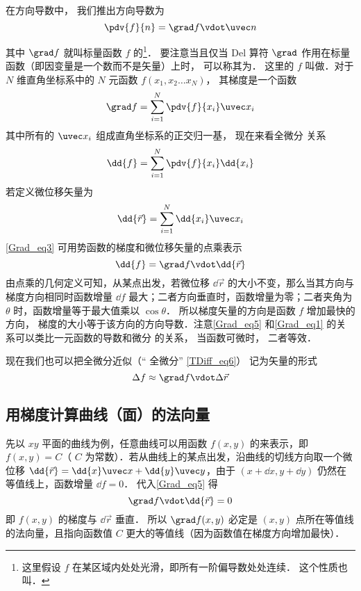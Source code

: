 

在方向导数中， 我们推出方向导数为
\begin{equation}\label{Grad_eq1}
\pdv{f}{n} = \grad f \vdot \uvec n
\end{equation}
 
其中 $\grad f$ 就叫标量函数 $f$ 的\footnote{这里假设 $f$ 在某区域内处处光滑，即所有一阶偏导数处处连续． 这个性质也叫．}． 要注意当且仅当 Del 算符 $\grad$ 作用在标量函数（即因变量是一个数而不是矢量）上时， 可以称其为． 这里的 $f$ 叫做．对于 $N$ 维直角坐标系中的 $N$ 元函数 $f(x_1,x_2\dots x_N)$， 其梯度是一个函数
\begin{equation}
\grad f = \sum_{i=1}^{N}\pdv{f}{x_i}\uvec x_i
\end{equation}
其中所有的 $\uvec x_i$ 组成直角坐标系的正交归一基， 现在来看全微分 关系
\begin{equation}\label{Grad_eq3}
\dd{f} = \sum_{i = 1}^N \pdv{f}{x_i} \dd{x_i}
\end{equation}
若定义微位移矢量为
\begin{equation}
\dd{\vec r} = \sum_{i=1}^{N} \dd{x_i} \uvec x_i
\end{equation}
\autoref{Grad_eq3} 可用势函数的梯度和微位移矢量的点乘表示
\begin{equation}\label{Grad_eq5}
\dd{f} = \grad f \vdot \dd{\vec r}
\end{equation}
由点乘的几何定义可知，从某点出发，若微位移 $\dd{\vec r}$ 的大小不变，那么当其方向与梯度方向相同时函数增量 $\dd{f}$ 最大；二者方向垂直时，函数增量为零；二者夹角为 $\theta$ 时，函数增量等于最大值乘以 $\cos \theta$． 所以梯度矢量的方向是函数 $f$ 增加最快的方向， 梯度的大小等于该方向的方向导数．注意\autoref{Grad_eq5} 和\autoref{Grad_eq1} 的关系可以类比一元函数的导数和微分 的关系， 当函数可微时， 二者等效．

现在我们也可以把全微分近似（“ 全微分” \autoref{TDiff_eq6}） 记为矢量的形式
\begin{equation}\label{Grad_eq6}
\Delta f \approx \grad f \vdot \Delta \vec r
\end{equation}

\subsection{用梯度计算曲线（面）的法向量}
先以 $xy$ 平面的曲线为例，任意曲线可以用函数 $f(x,y)$ 的来表示，即 $f(x,y) = C$（ $C$ 为常数）．若从曲线上的某点出发，沿曲线的切线方向取一个微位移 $\dd{\vec r} = \dd{x}\uvec x + \dd{y} \uvec y$，由于 $(x+\dd{x}, y+\dd{y})$ 仍然在等值线上，函数增量 $\dd{f} = 0$． 代入\autoref{Grad_eq5} 得
\begin{equation}
\grad f \vdot \dd{\vec r} = 0
\end{equation}
即 $f(x,y)$ 的梯度与 $\dd{\vec r}$ 垂直． 所以 $\grad f(x,y)$ 必定是 $(x,y)$ 点所在等值线的法向量，且指向函数值 $C$ 更大的等值线（因为函数值在梯度方向增加最快）．

